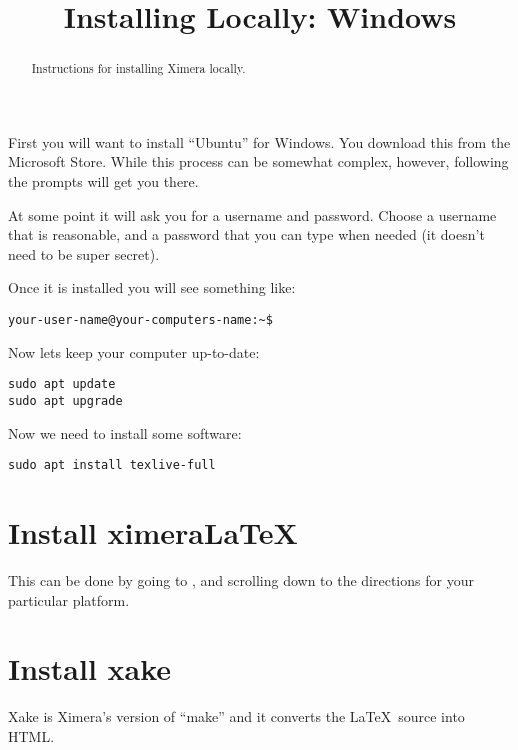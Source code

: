 \documentclass{ximera}
\title{Installing Locally: Windows}
\begin{document}
\begin{abstract}
Instructions for installing Ximera locally.
\end{abstract}
\maketitle

First you will want to install ``Ubuntu'' for Windows. You download
this from the Microsoft Store. While this process can be somewhat
complex, however, following the prompts will get you there.

At some point it will ask you for a username and password. Choose a
username that is reasonable, and a password that you can type when
needed (it doesn't need to be super secret).

Once it is installed you will see something like:

\begin{verbatim}
your-user-name@your-computers-name:~$
\end{verbatim}

Now lets keep your computer up-to-date:

\begin{verbatim}
sudo apt update
sudo apt upgrade
\end{verbatim}

Now we need to install some software:

\begin{verbatim}
sudo apt install texlive-full 
\end{verbatim}



\section{Install ximeraLaTeX}

This can be done by going to , and scrolling
down to the directions for your particular platform.


\section{Install xake}

Xake is Ximera's version of ``make'' and it converts the
\LaTeX\ source into HTML.
\end{document}
